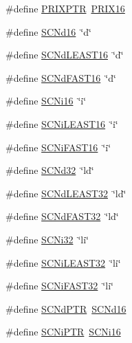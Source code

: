 \begin{DoxyCompactItemize}
\item 
\#define \hyperlink{group__avr__inttypes_ga65d9856517198cfc21558c0d6df64207}{P\+R\+I\+X\+P\+TR}~\hyperlink{group__avr__inttypes_ga570ca9af5087023f75fc8a1a602d26ab}{P\+R\+I\+X16}
\item 
\#define \hyperlink{group__avr__inttypes_ga35974d44b5dcebcb222b8e2c1384241d}{S\+C\+Nd16}~\char`\"{}d\char`\"{}
\item 
\#define \hyperlink{group__avr__inttypes_ga10db5de9c84ccfa6dc0e487dd72051f3}{S\+C\+Nd\+L\+E\+A\+S\+T16}~\char`\"{}d\char`\"{}
\item 
\#define \hyperlink{group__avr__inttypes_ga09c9f36f654aa50a548d7820421cdc57}{S\+C\+Nd\+F\+A\+S\+T16}~\char`\"{}d\char`\"{}
\item 
\#define \hyperlink{group__avr__inttypes_ga7b8508989273ad152f9b3b7cd4db6eee}{S\+C\+Ni16}~\char`\"{}i\char`\"{}
\item 
\#define \hyperlink{group__avr__inttypes_ga14ec2649667b53ff91a1103c02975837}{S\+C\+Ni\+L\+E\+A\+S\+T16}~\char`\"{}i\char`\"{}
\item 
\#define \hyperlink{group__avr__inttypes_gaad333b5bea32321b312a3b4967ff357f}{S\+C\+Ni\+F\+A\+S\+T16}~\char`\"{}i\char`\"{}
\item 
\#define \hyperlink{group__avr__inttypes_ga2b7ab77ff6ede9c3c285b714496f77e2}{S\+C\+Nd32}~\char`\"{}ld\char`\"{}
\item 
\#define \hyperlink{group__avr__inttypes_gae36c293972a5b770349d74f2c0cfa52f}{S\+C\+Nd\+L\+E\+A\+S\+T32}~\char`\"{}ld\char`\"{}
\item 
\#define \hyperlink{group__avr__inttypes_gadd733be35bef9dcef225edc99ade9e33}{S\+C\+Nd\+F\+A\+S\+T32}~\char`\"{}ld\char`\"{}
\item 
\#define \hyperlink{group__avr__inttypes_ga52cfc41a1e5ad73788faebbfeb9c14b0}{S\+C\+Ni32}~\char`\"{}li\char`\"{}
\item 
\#define \hyperlink{group__avr__inttypes_ga39be8ffb41be80bc951e955f111e4121}{S\+C\+Ni\+L\+E\+A\+S\+T32}~\char`\"{}li\char`\"{}
\item 
\#define \hyperlink{group__avr__inttypes_ga4739f89fa519cd77097677bf33320091}{S\+C\+Ni\+F\+A\+S\+T32}~\char`\"{}li\char`\"{}
\item 
\#define \hyperlink{group__avr__inttypes_gabf657ee6bd4b009b5b072840a3d7364f}{S\+C\+Nd\+P\+TR}~\hyperlink{group__avr__inttypes_ga35974d44b5dcebcb222b8e2c1384241d}{S\+C\+Nd16}
\item 
\#define \hyperlink{group__avr__inttypes_ga9c632ab51b24b93cc315b27a883be9eb}{S\+C\+Ni\+P\+TR}~\hyperlink{group__avr__inttypes_ga7b8508989273ad152f9b3b7cd4db6eee}{S\+C\+Ni16}

\end{DoxyCompactItemize}
